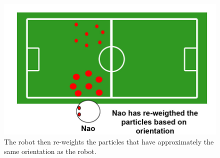 \documentclass[11pt]{report}
\begin{document}
\begin{figure}[h!] 
\centering
\includegraphics[scale=0.2]{../Drawings/localisation/localisationAlgorithmReweight.jpg}
\caption{The robot then re-weights the particles that have approximately the same orientation as the robot.}
\label{fig:reweight}
\end{figure}





%




\end{document}
